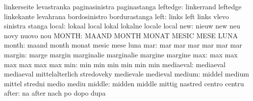                            linkerseite               levastranka
                           paginasinistra            paginastanga
                 leftedge: linkerrand                leftedge
                           linkekante                levahrana
                           bordosinistro             bordurastanga
                     left: links                     left
                           links                     vlevo
                           sinistra                  stanga
                    local: lokaal                    local
                           lokal                     lokalne
                           locale                    local
                      new: nieuw                     new
                           neu                       novy
                           nuovo                     nou
                    MONTH: MAAND                     MONTH
                           MONAT                     MESIC
                           MESE                      LUNA
                    month: maand                     month
                           monat                     mesic
                           mese                      luna
                      mar: mar                       mar
                           mar                       mar
                           mar                       mar
                   margin: marge                     margin
                           marginalie                marginalie
                           margine                   margine
                      max: max                       max
                           max                       max
                           max                       max
                      min: min                       min
                           min                       min
                           min                       min
                mediaeval: mediaeval                 mediaeval
                           mittelalterlich           stredoveky
                           medievale                 medieval
                   medium: middel                    medium
                           mittel                    stredni
                           medio                     mediu
                   middle: midden                    middle
                           mittig                    nastred
                           centro                    centru
                    after: na                        after
                           nach                      po
                           dopo                      dupa
